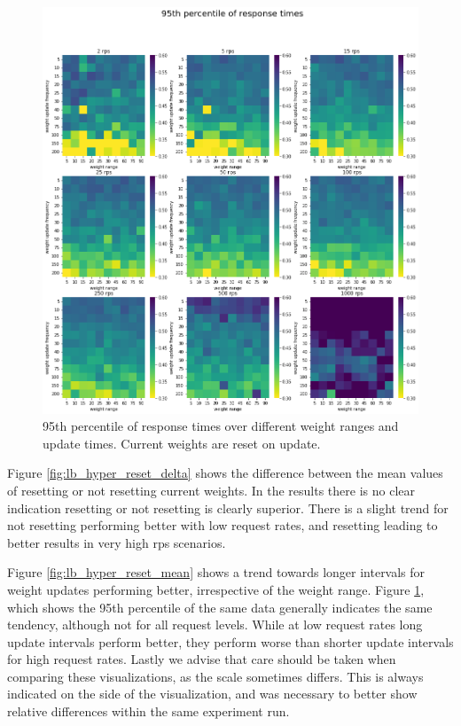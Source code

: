 \documentclass[draft,final]{vutinfth} %
\begin{document}
\begin{figure}
    \centering
    \includegraphics[width=14cm]{graphics/graphs/lb_hyper_95th_percentile_with_reset.png}
    \caption{95th percentile of response times over different weight ranges and update times. Current weights are reset on update.}
    \label{fig:lb_hyper_reset_q95}
\end{figure}

Figure \ref{fig:lb_hyper_reset_delta} shows the difference between the mean values of resetting or not resetting current weights.
In the results there is no clear indication resetting or not resetting is clearly superior.
There is a slight trend for not resetting performing better with low request rates, and resetting leading to better results in very high \gls{rps} scenarios.

Figure \ref{fig:lb_hyper_reset_mean} shows a trend towards longer intervals for weight updates performing better, irrespective of the weight range.
Figure \ref{fig:lb_hyper_reset_q95}, which shows the 95th percentile of the same data generally indicates the same tendency, although not for all request levels.
While at low request rates long update intervals perform better, they perform worse than shorter update intervals for high request rates.
Lastly we advise that care should be taken when comparing these visualizations, as the scale sometimes differs.
This is always indicated on the side of the visualization, and was necessary to better show relative differences within the same experiment run.
\end{document}
